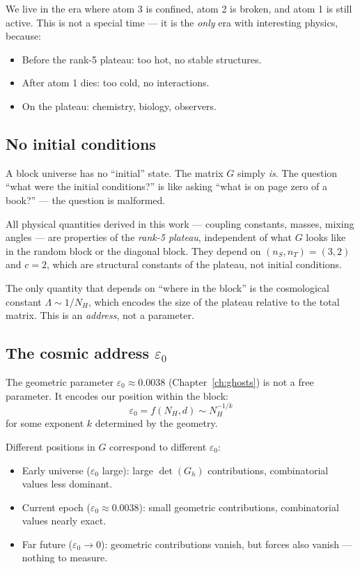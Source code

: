 \documentclass[12pt]{article}
\theoremstyle{remark}
\theoremstyle{definition}
\begin{document}
We live in the era where atom 3 is confined, atom 2 is broken, and atom 1 is still active. This is not a special time --- it is the \emph{only} era with interesting physics, because:
\begin{itemize}
\item Before the rank-5 plateau: too hot, no stable structures.
\item After atom 1 dies: too cold, no interactions.
\item On the plateau: chemistry, biology, observers.
\end{itemize}

\subsection{No initial conditions}

A block universe has no ``initial'' state. The matrix $G$ simply \emph{is}. The question ``what were the initial conditions?'' is like asking ``what is on page zero of a book?'' --- the question is malformed.

All physical quantities derived in this work --- coupling constants, masses, mixing angles --- are properties of the \emph{rank-5 plateau}, independent of what $G$ looks like in the random block or the diagonal block. They depend on $(n_S, n_T) = (3, 2)$ and $c = 2$, which are structural constants of the plateau, not initial conditions.

The only quantity that depends on ``where in the block'' is the cosmological constant $\Lambda \sim 1/N_H$, which encodes the size of the plateau relative to the total matrix. This is an \emph{address}, not a parameter.

\subsection{The cosmic address $\varepsilon_0$}

The geometric parameter $\varepsilon_0 \approx 0.0038$ (Chapter~\ref{ch:ghosts}) is not a free parameter. It encodes our position within the block:
\begin{equation}
\varepsilon_0 = f(N_H, d) \sim N_H^{-1/k}
\end{equation}
for some exponent $k$ determined by the geometry.

Different positions in $G$ correspond to different $\varepsilon_0$:
\begin{itemize}
\item Early universe ($\varepsilon_0$ large): large $\det(G_h)$ contributions, combinatorial values less dominant.
\item Current epoch ($\varepsilon_0 \approx 0.0038$): small geometric contributions, combinatorial values nearly exact.
\item Far future ($\varepsilon_0 \to 0$): geometric contributions vanish, but forces also vanish --- nothing to measure.
\end{itemize}
\end{document}

